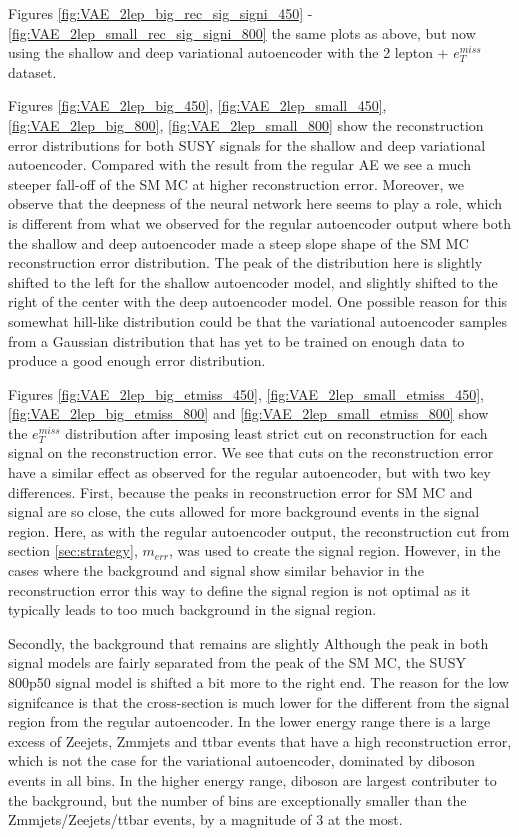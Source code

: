 Figures \ref{fig:VAE_2lep_big_rec_sig_signi_450} - \ref{fig:VAE_2lep_small_rec_sig_signi_800} 
the same plots as above, but now using the shallow and deep variational autoencoder with the 2 
lepton + $e_T^{miss}$ dataset. \par
Figures \ref{fig:VAE_2lep_big_450}, \ref{fig:VAE_2lep_small_450}, \ref{fig:VAE_2lep_big_800}, 
\ref{fig:VAE_2lep_small_800} show the reconstruction error distributions 
for both SUSY signals for the shallow and deep variational autoencoder. 
Compared with the result from the regular AE we see a much steeper fall-off of the SM MC at higher 
reconstruction error. Moreover, we observe that the deepness of the neural 
network here seems to play a role, which is different from what we observed for the regular autoencoder 
output where both the shallow and deep autoencoder made a steep slope shape of the SM MC reconstruction error 
distribution. The peak of the distribution here is slightly shifted to the left for the shallow 
autoencoder model, and slightly shifted to the right of the center with the deep autoencoder 
model. One possible reason for this somewhat hill-like distribution could be that the 
variational autoencoder samples from a Gaussian distribution that has yet to be trained on 
enough data to produce a good enough error distribution. \par 

Figures \ref{fig:VAE_2lep_big_etmiss_450}, \ref{fig:VAE_2lep_small_etmiss_450}, 
\ref{fig:VAE_2lep_big_etmiss_800} and  \ref{fig:VAE_2lep_small_etmiss_800} 
show the $e_T^{miss}$ distribution after imposing least strict cut on reconstruction for each signal on 
the reconstruction error. We see that cuts on the reconstruction error have a similar effect 
as observed for the regular autoencoder, but with two key differences.
First, because the peaks in reconstruction error for SM MC and signal
are so close, the cuts allowed for more background events in the signal region. Here, 
as with the regular autoencoder output, the reconstruction cut from section \ref{sec:strategy}, 
$m_{err}$, was used to create the signal region.
However, in the cases where the background and signal show similar behavior in 
the reconstruction error this way to define the signal region is not optimal as it 
typically leads to too much background in the signal region. \par
Secondly, the background that remains are slightly Although the peak in both
signal models are fairly separated from the peak of the SM MC, the SUSY 800p50 signal model is shifted a
bit more to the right end. The reason for the low signifcance is that the cross-section is much lower for the
different from the signal region from the regular autoencoder. In the lower energy range there 
is a large excess of Zeejets, Zmmjets and ttbar events that have a high reconstruction error, 
which is not the case for the variational autoencoder, dominated by diboson events in all bins. 
In the higher energy range, diboson are largest contributer to the background, but the number 
of bins are exceptionally smaller than the Zmmjets/Zeejets/ttbar events, by a magnitude of 3 at the most. 






